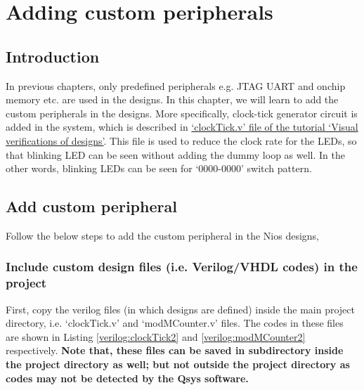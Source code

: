 \chapter{Adding custom peripherals} \label{ch:AddCustomPeripheral}

\graphicspath{{Chapters/NiosCustomIO/Figures/}}


\section{Introduction}
In previous chapters, only predefined peripherals e.g. JTAG UART and onchip memory etc. are used in the designs. In this chapter, we will learn to add the custom peripherals in the designs. More specifically, clock-tick generator circuit is added in the system, which is described in \href{http://pythondsp.blogspot.com/2016/10/chapter-5-verilog-visual-verifications.html#5.4-Clock-ticks}{`clockTick.v' file of the tutorial `Visual verifications of designs'}. This file is used to reduce the clock rate for the LEDs, so that blinking LED can be seen without adding the dummy loop as well. In the other words, blinking LEDs can be seen for `0000-0000' switch pattern. 

\section{Add custom peripheral}
Follow the below steps to add the custom peripheral in the Nios designs, 

\subsection{Include custom design files (i.e. Verilog/VHDL codes) in the project} 
First, copy the verilog files (in which designs are defined) inside the main project directory,  i.e. `clockTick.v' and `modMCounter.v' files. The codes in these files are shown in Listing \ref{verilog:clockTick2} and \ref{verilog:modMCounter2} respectively. \textbf{Note that, these files can be saved in subdirectory inside the project directory as well; but not outside the project directory as codes may not be detected by the Qsys software.}



